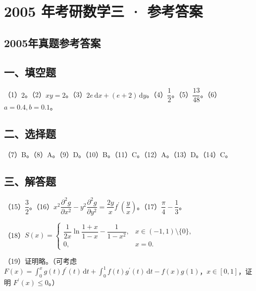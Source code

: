 \documentclass[UTF8,12pt]{ctexart}
\begin{document}
\section*{2005 年考研数学三 · 参考答案}
\subsection*{2005年真题参考答案}

\subsection*{一、填空题}

（1）\(\displaystyle 2\)。（2）\(\displaystyle xy=2\)。（3）\(\displaystyle 2e\,\mathrm dx+(e+2)\,\mathrm dy\)。（4）\(\displaystyle \dfrac{\displaystyle 1}{\displaystyle 2}\)。（5）\(\displaystyle \dfrac{\displaystyle 13}{\displaystyle 48}\)。（6）\(\displaystyle a=0.4,\allowbreak b=0.1\)。


\subsection*{二、选择题}

（7）B。（8）A。（9）D。（10）B。（11）C。（12）A。（13）D。（14）C。


\subsection*{三、解答题}

（15）\(\displaystyle \dfrac{\displaystyle 3}{\displaystyle 2}\)。（16）\(\displaystyle x^2\dfrac{\displaystyle \partial^2g}{\displaystyle \partial x^2}-y^2\dfrac{\displaystyle \partial^2g}{\displaystyle \partial y^2}=\dfrac{\displaystyle 2y}{\displaystyle x}f^{\prime}(\dfrac{\displaystyle y}{\displaystyle x})\)。（17）\(\displaystyle \dfrac{\displaystyle \pi}{\displaystyle 4}-\dfrac{\displaystyle 1}{\displaystyle 3}\)。


（18）\(\displaystyle S(x)=\begin{cases}\dfrac{\displaystyle 1}{\displaystyle 2x}\ln\dfrac{\displaystyle 1+x}{\displaystyle 1-x}-\dfrac{\displaystyle 1}{\displaystyle 1-x^2},\allowbreak &x\in(-1,\allowbreak 1)\setminus\{0\},\allowbreak \\0,\allowbreak &x=0.\end{cases}\)


（19）证明略。（可考虑 \(\displaystyle F(x)=\displaystyle \int_0^xg(t)f^{\prime}(t)\,\mathrm dt+\displaystyle \int_0^1f(t)g^{\prime}(t)\,\mathrm dt-f(x)g(1)\)，\(\displaystyle x\in[0,\allowbreak 1]\)，证明 \(\displaystyle F^{\prime}(x)\le0\)。）
\end{document}
